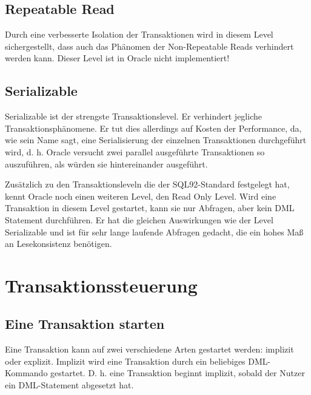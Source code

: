       \subsection{Repeatable Read}
        Durch eine verbesserte Isolation der Transaktionen wird in diesem Level sichergestellt, dass auch das Ph\"anomen der Non-Repeatable Reads verhindert werden kann. Dieser Level ist in Oracle nicht implementiert!
      \subsection{Serializable}
        Serializable ist der strengste Transaktionslevel. Er verhindert jegliche Trans\-akt\-ions\-ph\"a\-no\-me\-ne. Er tut dies allerdings auf Kosten der Performance, da, wie sein Name sagt, eine Serialisierung der einzelnen Transaktionen durchgef\"uhrt wird, d. h. Oracle versucht zwei parallel ausgef\"uhrte Transaktionen so auszuf\"uhren, als w\"urden sie hintereinander ausgef\"uhrt.

        Zus\"atzlich zu den Transaktionsleveln die der SQL92-Standard festgelegt hat, kennt Oracle noch einen weiteren Level, den Read Only Level. Wird eine Transaktion in diesem Level gestartet, kann sie nur Abfragen, aber kein DML Statement durchf\"uhren. Er hat die gleichen Auswirkungen wie der Level Serializable und ist f\"ur sehr lange laufende Abfragen gedacht, die ein hohes Ma\ss{} an Lesekonsistenz ben\"otigen.


    \section{Transaktionssteuerung}
      \subsection{Eine Transaktion starten}
        Eine Transaktion kann auf zwei verschiedene Arten gestartet werden: implizit oder explizit. Implizit wird eine Transaktion durch ein beliebiges DML-Kommando gestartet. D. h. eine Transaktion beginnt implizit, sobald der Nutzer ein DML-Statement abgesetzt hat.

